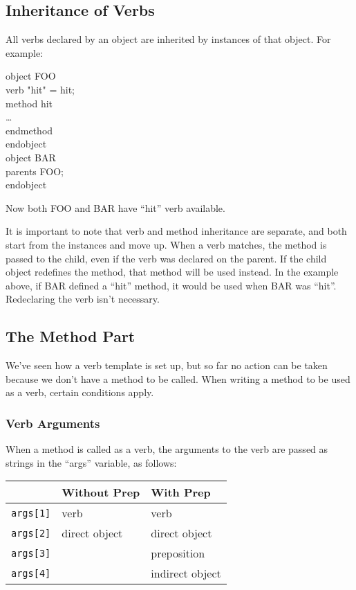 \subsection{Inheritance of Verbs}

All verbs declared by an object are inherited by instances of that
object.  For example:

\begin{code}
object FOO \\
\ind verb "hit" = hit; \\
\ind method hit \\
\ind \ind \ldots \\
\ind endmethod \\
endobject \\
object BAR \\
\ind parents FOO; \\
endobject
\end{code}
    
Now both FOO and BAR have ``hit'' verb available.  

It is important to note that verb and method inheritance are separate,
and both start from the instances and move up.  When a verb matches,
the method is passed to the child, even if the verb was declared
on the parent.  If the child object redefines the method, that
method will be used instead.  In the example above, if BAR defined a
``hit'' method, it would be used when BAR was ``hit''.  Redeclaring the
verb isn't necessary.

\subsection{The Method Part}

We've seen how a verb template is set up, but so far no action
can be taken because we don't have a method to be called.  When
writing a method to be used as a verb, certain conditions apply.

\subsubsection{Verb Arguments}

When a method is called as a verb, the arguments to the verb
are passed as strings in the ``args'' variable, as follows:

\begin{tabular}{|l|l|l|}
\hline
                & Without Prep    & With Prep \\
\hline
{\tt args[1]}   & verb            & verb \\
{\tt args[2]}   & direct object   & direct object \\
{\tt args[3]}   &                 & preposition \\
{\tt args[4]}   &                 & indirect object \\
\hline
\end{tabular}

